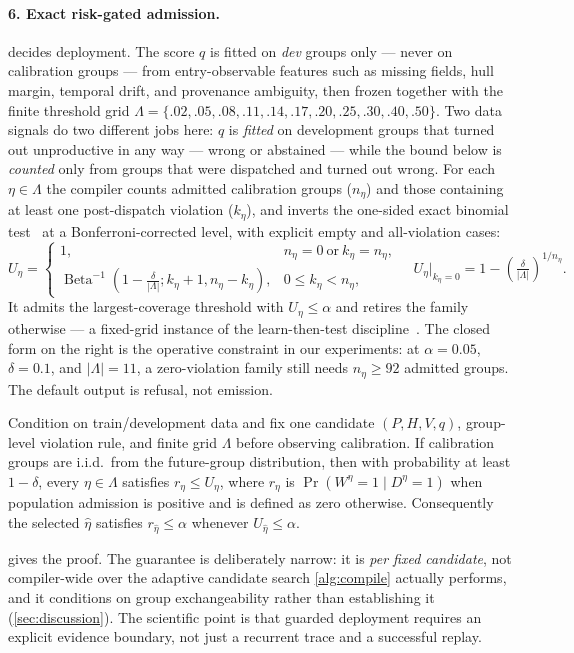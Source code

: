 \paragraph{6. Exact risk-gated admission.}
 decides deployment. The score $q$ is fitted on \emph{dev}
groups only --- never on calibration groups --- from entry-observable features
such as missing fields, hull margin, temporal drift, and provenance ambiguity,
then frozen together with the finite threshold grid
$\Lambda=\{.02,.05,.08,.11,.14,.17,.20,.25,.30,.40,.50\}$. Two data signals do
two different jobs here: $q$ is \emph{fitted} on development groups that turned out
unproductive in any way --- wrong or abstained --- while the bound below is
\emph{counted} only from groups that were dispatched and turned out wrong. For each
$\eta\in\Lambda$ the compiler counts admitted calibration groups ($n_\eta$) and
those containing at least one post-dispatch violation ($k_\eta$), and inverts
the one-sided exact binomial test~\citep{clopper1934binomial} at a
Bonferroni-corrected level, with explicit empty and all-violation cases:
\begin{equation}
  U_\eta=\begin{cases}
  1, & n_\eta=0\ \text{or}\ k_\eta=n_\eta,\\
  \operatorname{Beta}^{-1}\!\left(1-\tfrac{\delta}{|\Lambda|};
  k_\eta+1,n_\eta-k_\eta\right), & 0\le k_\eta<n_\eta,
  \end{cases}
  \quad U_\eta\big|_{k_\eta=0}=1-\left(\tfrac{\delta}{|\Lambda|}\right)^{1/n_\eta}.
  \label{eq:cp}
\end{equation}
It admits the largest-coverage threshold with $U_\eta\le\alpha$ and retires the
family otherwise --- a fixed-grid instance of the learn-then-test
discipline~\citep{angelopoulos2022ltt}. The closed form on the
right is the operative constraint in our experiments: at $\alpha=0.05$, $\delta=0.1$,
and $|\Lambda|=11$, a zero-violation family still needs $n_\eta\ge 92$ admitted
groups. The default output is refusal, not emission.



\begin{proposition}
\label{prop:admission}
Condition on train/development data and fix one candidate $(P,H,V,q)$,
group-level violation rule, and finite grid $\Lambda$ before observing
calibration. If calibration groups are i.i.d.\ from the future-group
distribution, then with probability at least $1-\delta$, every
$\eta\in\Lambda$ satisfies $r_\eta\le U_\eta$, where
$r_\eta$ is $\Pr(W^\eta=1\mid D^\eta=1)$ when population admission is positive
and is defined as zero otherwise. Consequently the selected $\hat\eta$ satisfies
$r_{\hat\eta}\le\alpha$ whenever $U_{\hat\eta}\le\alpha$.
\end{proposition}

 gives the proof. The guarantee is deliberately narrow: it is
\emph{per fixed candidate}, not compiler-wide over the adaptive candidate
search \cref{alg:compile} actually performs, and it conditions on group
exchangeability rather than establishing it (\cref{sec:discussion}). The
scientific point is that guarded deployment requires an explicit evidence
boundary, not just a recurrent trace and a successful replay.
